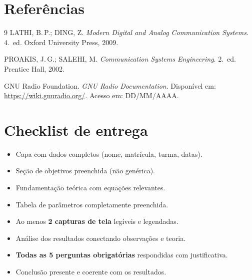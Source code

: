\documentclass[12pt,a4paper]{article}
\newcommand{\dataEntrega}{DD/MM/AAAA}
\begin{document}
\vspace{4cm}

\section*{Referências}
\begin{thebibliography}{9}
    LATHI, B.\,P.; DING, Z\@.
    \textit{Modern Digital and Analog Communication Systems}.
    4.~ed. Oxford University Press, 2009.

    PROAKIS, J.\,G.; SALEHI, M\@.
    \textit{Communication Systems Engineering}.
    2.~ed. Prentice Hall, 2002.

    GNU Radio Foundation.
    \textit{GNU Radio Documentation}.
    Disponível em: \url{https://wiki.gnuradio.org/}.
    Acesso em: \dataEntrega.
\end{thebibliography}

\section*{Checklist de entrega}
\begin{itemize}[leftmargin=2em]
  \item[$\square$] Capa com dados completos (nome, matrícula, turma, datas).
  \item[$\square$] Seção de objetivos preenchida (não genérica).
  \item[$\square$] Fundamentação teórica com equações relevantes.
  \item[$\square$] Tabela de parâmetros completamente preenchida.
  \item[$\square$] Ao menos \textbf{2 capturas de tela} legíveis e legendadas.
  \item[$\square$] Análise dos resultados conectando observações e teoria.
  \item[$\square$] \textbf{Todas as 5 perguntas obrigatórias} respondidas com
    justificativa.
  \item[$\square$] Conclusão presente e coerente com os resultados.
\end{itemize}
\end{document}

